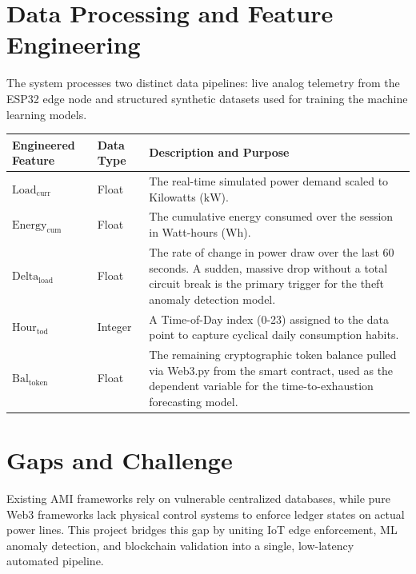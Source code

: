 \section{Data Processing and Feature Engineering}
The system processes two distinct data pipelines: live analog telemetry from the ESP32 edge node and structured synthetic datasets used for training the machine learning models.
\begin{table}[h!]
    \centering
    \renewcommand{\arraystretch}{1.5} %
    \begin{tabular}{|l|l|p{8.5cm}|}
        \hline
        \textbf{Engineered Feature} & \textbf{Data Type} & \textbf{Description and Purpose} \\
        \hline
        $\text{Load}_{\text{curr}}$ & Float & The real-time simulated power demand scaled to Kilowatts ($\text{kW}$). \\
        \hline
        $\text{Energy}_{\text{cum}}$ & Float & The cumulative energy consumed over the session in Watt-hours ($\text{Wh}$). \\
        \hline
        $\text{Delta}_{\text{load}}$ & Float & The rate of change in power draw over the last 60 seconds. A sudden, massive drop without a total circuit break is the primary trigger for the theft anomaly detection model. \\
        \hline
        $\text{Hour}_{\text{tod}}$ & Integer & A Time-of-Day index (0-23) assigned to the data point to capture cyclical daily consumption habits. \\
        \hline
        $\text{Bal}_{\text{token}}$ & Float & The remaining cryptographic token balance pulled via Web3.py from the smart contract, used as the dependent variable for the time-to-exhaustion forecasting model. \\
        \hline
    \end{tabular}
\end{table}

\section{Gaps and Challenge}
Existing AMI frameworks rely on vulnerable centralized databases, while pure Web3 frameworks lack physical control systems to enforce ledger states on actual power lines. This project bridges this gap by uniting IoT edge enforcement, ML anomaly detection, and blockchain validation into a single, low-latency automated pipeline.\cite{ref4}